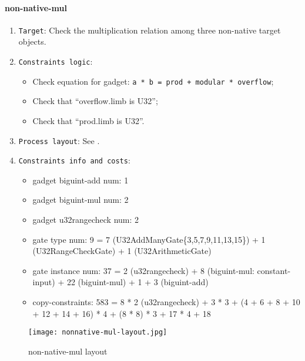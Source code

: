 \paragraph{non-native-mul}

\begin{enumerate}
    \item \verb|Target|: Check the multiplication relation among three non-native target objects.
    \item \verb|Constraints logic|:
    \begin{itemize}
        \item Check equation for gadget: \verb|a * b = prod + modular * overflow|;
        \item Check that ``overflow.limb is U32'';
        \item Check that ``prod.limb is U32''.
    \end{itemize}
    \item \verb|Process layout|: See .
    \item \verb|Constraints info and costs|:
    \begin{itemize}
        \item gadget biguint-add num: 1
        \item gadget biguint-mul num: 2
        \item gadget u32rangecheck num: 2
        \item gate type num: 9 = 7 (U32AddManyGate\{3,5,7,9,11,13,15\}) + 1 (U32RangeCheckGate) + 1 (U32ArithmeticGate)
        \item gate instance num: 37 = 2 (u32rangecheck) + 8 (biguint-mul: constant-input) + 22 (biguint-mul) + 1 + 3 (biguint-add)
        \item copy-constraints: 583 = 8 * 2 (u32rangecheck) + 3 * 3 + (4 + 6 + 8 + 10 + 12 + 14 + 16) * 4 + (8 * 8) * 3 + 17 * 4 + 18
    \end{itemize}
\end{enumerate}

\begin{figure}[!ht]
    \centering
    \texttt{[image: nonnative-mul-layout.jpg]}
    \caption{non-native-mul layout}
    \label{fig:non-native-mul-layout}
\end{figure}